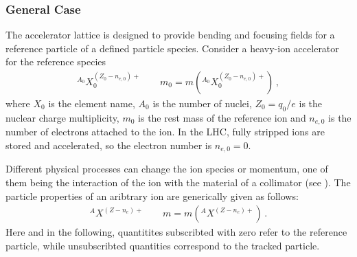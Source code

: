 \subsubsection{General Case}
The accelerator lattice is designed to provide bending and focusing fields for a reference particle of a defined particle species. Consider a heavy-ion accelerator for the reference species
\begin{align}
^{A_0}X_0^{(Z_0-n_{e,0})+} \quad \quad m_0 = m\left( ^{A_0}X_0^{(Z_0-n_{e,0})+} \right) \, ,
\end{align}
where $X_0$ is the element name, $A_0$ is the number of nuclei, $Z_0=q_0/e$ is the nuclear charge multiplicity, $m_0$ is the rest mass of the reference ion and $n_{e,0}$ is the number of electrons attached to the ion. In the LHC, fully stripped \lead ions are stored and accelerated, so the electron number is $n_{e,0}=0$. 


Different physical processes can change the ion species or momentum, one of them being the interaction of the ion with the material of a collimator (see ). The particle properties of an aribtrary ion are generically given as follows:
\begin{align}
^{A}X^{(Z-n_{e})+} \quad \quad m = m\left( ^{A}X^{(Z-n_e)+} \right) \, .
\end{align}
Here and in the following, quantitites subscribted with zero refer to the reference particle, while unsubscribted quantities correspond to the tracked particle. 


